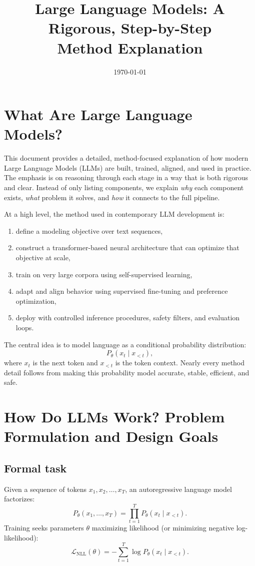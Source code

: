 \documentclass[12pt]{article}
\title{\textbf{Large Language Models: A Rigorous, Step-by-Step\\Method Explanation}}
\author{}
\date{\today}
\begin{document}
\maketitle
\tableofcontents
\newpage

\section{What Are Large Language Models?}

This document provides a detailed, method-focused explanation of how modern Large Language Models (LLMs) are built, trained, aligned, and used in practice. The emphasis is on reasoning through each stage in a way that is both rigorous and clear. Instead of only listing components, we explain \emph{why} each component exists, \emph{what} problem it solves, and \emph{how} it connects to the full pipeline.

At a high level, the method used in contemporary LLM development is:
\begin{enumerate}
    \item define a modeling objective over text sequences,
    \item construct a transformer-based neural architecture that can optimize that objective at scale,
    \item train on very large corpora using self-supervised learning,
    \item adapt and align behavior using supervised fine-tuning and preference optimization,
    \item deploy with controlled inference procedures, safety filters, and evaluation loops.
\end{enumerate}

The central idea is to model language as a conditional probability distribution:
\[
P_\theta(x_t \mid x_{<t}),
\]
where \(x_t\) is the next token and \(x_{<t}\) is the token context. Nearly every method detail follows from making this probability model accurate, stable, efficient, and safe.

\section{How Do LLMs Work? Problem Formulation and Design Goals}

\subsection{Formal task}

Given a sequence of tokens \(x_1, x_2, \dots, x_T\), an autoregressive language model factorizes:
\[
P_\theta(x_1,\dots,x_T)=\prod_{t=1}^{T} P_\theta(x_t \mid x_{<t}).
\]
Training seeks parameters \(\theta\) maximizing likelihood (or minimizing negative log-likelihood):
\[
\mathcal{L}_{\text{NLL}}(\theta)= - \sum_{t=1}^{T}\log P_\theta(x_t\mid x_{<t}).
\]
\end{document}
